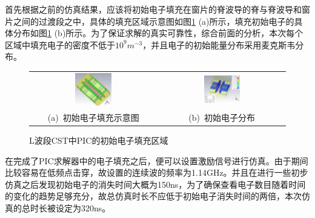 \documentclass[master]{thesis-uestc}
\begin{document}
首先根据之前的仿真结果，应该将初始电子填充在窗片的脊波导的脊与脊波导和窗片之间的过渡段之中，具体的填充区域示意图如图\ref{fig:L波段CST电子填充方法} (a)所示，填充初始电子的具体分布如图\ref{fig:L波段CST电子填充方法} (b)所示。为了保证求解的真实可靠性，综合前面的分析，本次每个区域中填充电子的密度不低于$10^9 m^{-3}$，并且电子的初始能量分布采用麦克斯韦分布。
\begin{figure}[!htb]
    \small
    \centering
    \begin{tabular}{@{\ }c@{\ }c}
        \includegraphics[width=0.3\textwidth]{pic/chapter4/L波段CST电子填充方法.png} & 
        \hspace{5pt}
        \includegraphics[width=0.3\textwidth]{pic/chapter4/LSP3D电子初始分布侧视图.png}     \\
        \mbox{\small (a) 初始电子填充示意图}                                                                               & 
        \mbox{\small (b) 初始电子分布}                                                                                  \\
    \end{tabular}
    \caption{L波段CST中PIC的初始电子填充区域}
    \label{fig:L波段CST电子填充方法}
\end{figure}

在完成了PIC求解器中的电子填充之后，便可以设置激励信号进行仿真。由于期间比较容易在低频点击穿，故设置的连续波的频率为1.14GHz。并且在进行一些初步仿真之后发现初始电子的消失时间大概为150ns，为了确保查看电子数目随着时间的变化的趋势足够充分，故总仿真时长不应低于初始电子消失时间的两倍，本次仿真的总时长被设定为320ns。
\end{document}
